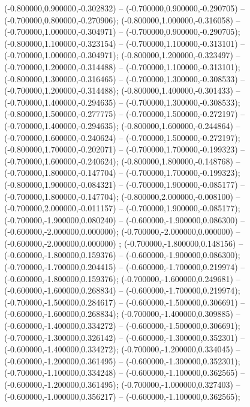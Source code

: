  (-0.800000,0.900000,-0.302832) -- (-0.700000,0.900000,-0.290705) -- (-0.700000,0.800000,-0.270906);
 (-0.800000,1.000000,-0.316058) -- (-0.700000,1.000000,-0.304971) -- (-0.700000,0.900000,-0.290705);
 (-0.800000,1.100000,-0.323154) -- (-0.700000,1.100000,-0.313101) -- (-0.700000,1.000000,-0.304971);
 (-0.800000,1.200000,-0.323497) -- (-0.700000,1.200000,-0.314488) -- (-0.700000,1.100000,-0.313101);
 (-0.800000,1.300000,-0.316465) -- (-0.700000,1.300000,-0.308533) -- (-0.700000,1.200000,-0.314488);
 (-0.800000,1.400000,-0.301433) -- (-0.700000,1.400000,-0.294635) -- (-0.700000,1.300000,-0.308533);
 (-0.800000,1.500000,-0.277775) -- (-0.700000,1.500000,-0.272197) -- (-0.700000,1.400000,-0.294635);
 (-0.800000,1.600000,-0.244864) -- (-0.700000,1.600000,-0.240624) -- (-0.700000,1.500000,-0.272197);
 (-0.800000,1.700000,-0.202071) -- (-0.700000,1.700000,-0.199323) -- (-0.700000,1.600000,-0.240624);
 (-0.800000,1.800000,-0.148768) -- (-0.700000,1.800000,-0.147704) -- (-0.700000,1.700000,-0.199323);
 (-0.800000,1.900000,-0.084321) -- (-0.700000,1.900000,-0.085177) -- (-0.700000,1.800000,-0.147704);
 (-0.800000,2.000000,-0.008100) -- (-0.700000,2.000000,-0.011157) -- (-0.700000,1.900000,-0.085177);
 (-0.700000,-1.900000,0.080240) -- (-0.600000,-1.900000,0.086300) -- (-0.600000,-2.000000,0.000000);
 (-0.700000,-2.000000,0.000000) -- (-0.600000,-2.000000,0.000000) ;
 (-0.700000,-1.800000,0.148156) -- (-0.600000,-1.800000,0.159376) -- (-0.600000,-1.900000,0.086300);
 (-0.700000,-1.700000,0.204415) -- (-0.600000,-1.700000,0.219974) -- (-0.600000,-1.800000,0.159376);
 (-0.700000,-1.600000,0.249681) -- (-0.600000,-1.600000,0.268834) -- (-0.600000,-1.700000,0.219974);
 (-0.700000,-1.500000,0.284617) -- (-0.600000,-1.500000,0.306691) -- (-0.600000,-1.600000,0.268834);
 (-0.700000,-1.400000,0.309885) -- (-0.600000,-1.400000,0.334272) -- (-0.600000,-1.500000,0.306691);
 (-0.700000,-1.300000,0.326142) -- (-0.600000,-1.300000,0.352301) -- (-0.600000,-1.400000,0.334272);
 (-0.700000,-1.200000,0.334045) -- (-0.600000,-1.200000,0.361495) -- (-0.600000,-1.300000,0.352301);
 (-0.700000,-1.100000,0.334248) -- (-0.600000,-1.100000,0.362565) -- (-0.600000,-1.200000,0.361495);
 (-0.700000,-1.000000,0.327403) -- (-0.600000,-1.000000,0.356217) -- (-0.600000,-1.100000,0.362565);
